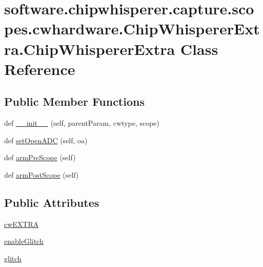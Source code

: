 \hypertarget{classsoftware_1_1chipwhisperer_1_1capture_1_1scopes_1_1cwhardware_1_1ChipWhispererExtra_1_1ChipWhispererExtra}{}\section{software.\+chipwhisperer.\+capture.\+scopes.\+cwhardware.\+Chip\+Whisperer\+Extra.\+Chip\+Whisperer\+Extra Class Reference}
\label{classsoftware_1_1chipwhisperer_1_1capture_1_1scopes_1_1cwhardware_1_1ChipWhispererExtra_1_1ChipWhispererExtra}
\subsection*{Public Member Functions}
\begin{DoxyCompactItemize}
\item 
def \hyperlink{classsoftware_1_1chipwhisperer_1_1capture_1_1scopes_1_1cwhardware_1_1ChipWhispererExtra_1_1ChipWhispererExtra_a115c60f6dab7568c25cc8cfd5ade332a}{\+\_\+\+\_\+init\+\_\+\+\_\+} (self, parent\+Param, cwtype, scope)
\item 
def \hyperlink{classsoftware_1_1chipwhisperer_1_1capture_1_1scopes_1_1cwhardware_1_1ChipWhispererExtra_1_1ChipWhispererExtra_a1dbd009f74e8175320881f0574f57eee}{set\+Open\+A\+D\+C} (self, oa)
\item 
def \hyperlink{classsoftware_1_1chipwhisperer_1_1capture_1_1scopes_1_1cwhardware_1_1ChipWhispererExtra_1_1ChipWhispererExtra_a4e6eb74dc2f6066faa842501ac94481e}{arm\+Pre\+Scope} (self)
\item 
def \hyperlink{classsoftware_1_1chipwhisperer_1_1capture_1_1scopes_1_1cwhardware_1_1ChipWhispererExtra_1_1ChipWhispererExtra_ad5021424a56fe4d03a37e3843d311e58}{arm\+Post\+Scope} (self)
\end{DoxyCompactItemize}
\subsection*{Public Attributes}
\begin{DoxyCompactItemize}
\item 
\hyperlink{classsoftware_1_1chipwhisperer_1_1capture_1_1scopes_1_1cwhardware_1_1ChipWhispererExtra_1_1ChipWhispererExtra_a55082cef3d758f5300a2940213bf3587}{cw\+E\+X\+T\+R\+A}
\item 
\hyperlink{classsoftware_1_1chipwhisperer_1_1capture_1_1scopes_1_1cwhardware_1_1ChipWhispererExtra_1_1ChipWhispererExtra_a1188cd109054d98e8a7d82a6e13cb885}{enable\+Glitch}
\item 
\hyperlink{classsoftware_1_1chipwhisperer_1_1capture_1_1scopes_1_1cwhardware_1_1ChipWhispererExtra_1_1ChipWhispererExtra_ae6b55ce36d15d208dfaefc267d4def32}{glitch}
\end{DoxyCompactItemize}


